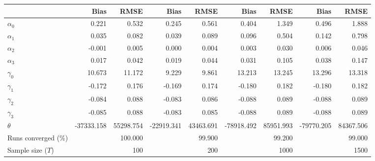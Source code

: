 
\begin{tabular}[t]{lrrrrrrrr}
\toprule
  & Bias & RMSE & Bias & RMSE & Bias & RMSE & Bias & RMSE\\
\midrule
$\alpha_{0}$ & 0.221 & 0.532 & 0.245 & 0.561 & 0.404 & 1.349 & 0.496 & 1.888\\
$\alpha_{1}$ & 0.035 & 0.082 & 0.039 & 0.089 & 0.096 & 0.504 & 0.142 & 0.798\\
$\alpha_{2}$ & -0.001 & 0.005 & 0.000 & 0.004 & 0.003 & 0.030 & 0.006 & 0.046\\
$\alpha_{3}$ & 0.017 & 0.042 & 0.019 & 0.044 & 0.031 & 0.105 & 0.038 & 0.147\\
$\gamma_{0}$ & 10.673 & 11.172 & 9.229 & 9.861 & 13.213 & 13.245 & 13.296 & 13.318\\
$\gamma_{1}$ & -0.172 & 0.176 & -0.169 & 0.174 & -0.180 & 0.182 & -0.180 & 0.182\\
$\gamma_{2}$ & -0.084 & 0.088 & -0.083 & 0.086 & -0.088 & 0.089 & -0.088 & 0.089\\
$\gamma_{3}$ & -0.085 & 0.088 & -0.083 & 0.085 & -0.088 & 0.089 & -0.088 & 0.089\\
$\theta$ & -37333.158 & 55298.754 & -22919.341 & 43463.691 & -78918.492 & 85951.993 & -79770.205 & 84367.506\\
Runs converged (\%) &  & 100.000 &  & 99.900 &  & 99.200 &  & 99.000\\
Sample size ($T$) &  & 100 &  & 200 &  & 1000 &  & 1500\\
\bottomrule
\end{tabular}
